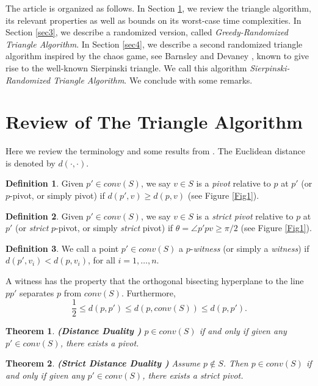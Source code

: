 \documentclass{article}
\newtheorem{thm}{Theorem}
\theoremstyle{definition}
\newtheorem{definition}{Definition}
\begin{document}
The article is organized as follows. In Section \ref{sec2}, we review the triangle algorithm, its relevant properties as well as bounds on its worst-case time complexities. In Section \ref{sec3}, we describe a randomized version, called {\it Greedy-Randomized Triangle Algorithm}. In Section \ref{sec4}, we describe a second randomized triangle algorithm inspired by the chaos game, see  Barnsley \cite{Barn93} and Devaney \cite{Devaney2004}, known to give rise to the well-known Sierpinski triangle.  We call this algorithm {\it Sierpinski-Randomized Triangle Algorithm}. We conclude with some remarks.

\section{Review of The Triangle Algorithm} \label{sec2}

Here we review the terminology and some results from \cite{kal14}. The Euclidean distance is denoted by $d(\cdot, \cdot)$.

\begin{definition} Given $p' \in conv(S)$, we say $v \in S$ is a {\it pivot} relative to $p$  at $p'$ (or $p$-pivot, or simply pivot) if $d(p',v) \geq d(p,v)$ (see Figure \ref{Fig1}).
\end{definition}

\begin{definition} Given $p' \in conv(S)$, we say $v \in S$ is a {\it strict pivot} relative to $p$ at $p'$ (or {\it strict} $p$-pivot, or simply {\it strict} pivot) if $\theta=\angle p'pv \geq \pi/2$ (see Figure \ref{Fig1}).
\end{definition}

\begin{definition} \label{defn4} We call a point $p' \in conv(S)$ a $p$-{\it witness} (or simply a {\it witness}) if $d(p',v_i) < d(p,v_i)$, for all $i=1, \dots, n$.
\end{definition}

A witness has the property that the orthogonal bisecting hyperplane to the line $pp'$ separates $p$ from $conv(S)$. Furthermore,
$$\frac{1}{2}\leq d(p,p')  \leq  d(p, conv(S)) \leq d(p,p').$$

\begin{thm} \label{thm1} {\bf (Distance Duality \cite{kal14})} $p \in conv(S)$ if and only if given any  $p' \in conv(S)$, there exists a pivot.
\end{thm}

\begin{thm}  \label{thm2} {\bf (Strict Distance Duality \cite{kal14})} Assume $p \not \in S$.  Then $p \in conv(S)$ if and only if given any  $p' \in conv(S)$, there exists a strict pivot.
\end{thm}
\end{document}

